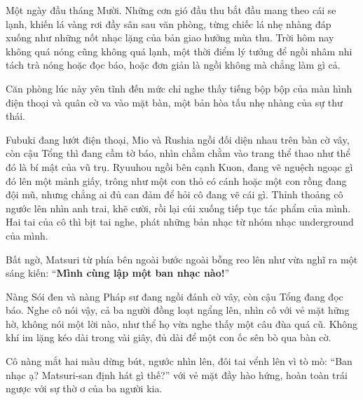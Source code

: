 \documentclass[../main.tex]{subfiles}
\begin{document}

Một ngày đầu tháng Mười. Những cơn gió đầu thu bắt đầu mang theo cái se lạnh, khiến lá vàng rơi đầy sân sau văn phòng, từng chiếc lá nhẹ nhàng đáp xuống như những nốt nhạc lặng của bản giao hưởng mùa thu. Trời hôm nay không quá nóng cũng không quá lạnh, một thời điểm lý tưởng để ngồi nhâm nhi tách trà nóng hoặc đọc báo, hoặc đơn giản là ngồi không mà chẳng làm gì cả.

Căn phòng lúc này yên tĩnh đến mức chỉ nghe thấy tiếng bộp bộp của màn hình điện thoại và quân cờ va vào mặt bàn, một bản hòa tấu nhẹ nhàng của sự thư thái.

Fubuki đang lướt điện thoại, Mio và Rushia ngồi đối diện nhau trên bàn cờ vây, còn cậu Tổng thì đang cầm tờ báo, nhìn chằm chằm vào trang thể thao như thể đó là bí mật của vũ trụ. Ryuuhou ngồi bên cạnh Kuon, đang vẽ nguệch ngoạc gì đó lên một mảnh giấy, trông như một con thỏ có cánh hoặc một con rồng đang đội mũ, nhưng chẳng ai đủ can đảm để hỏi cô đang vẽ cái gì. Thỉnh thoảng cô ngước lên nhìn anh trai, khẽ cười, rồi lại cúi xuống tiếp tục tác phẩm của mình. Hai tai của cô thì bịt tai nghe, phát những bản nhạc từ nhóm nhạc underground của mình.

Bất ngờ, Matsuri từ phía bên ngoài bước ngoài bỗng reo lên như vừa nghĩ ra một sáng kiến: ``\textbf{Mình cùng lập một ban nhạc nào!}''

Nàng Sói đen và nàng Pháp sư đang ngồi đánh cờ vây, còn cậu Tổng đang đọc báo. Nghe cô nói vậy, cả ba người đồng loạt ngẩng lên, nhìn cô với vẻ mặt hững hờ, không nói một lời nào, như thể họ vừa nghe thấy một câu đùa quá cũ. Không khí im lặng kéo dài trong vài giây, đủ dài để một con ốc sên bò qua bàn cờ.

Cô nàng mắt hai màu dừng bút, ngước nhìn lên, đôi tai vểnh lên vì tò mò: ``Ban nhạc ạ? Matsuri-san định hát gì thế?'' với vẻ mặt đầy hào hứng, hoàn toàn trái ngược với sự thờ ơ của ba người kia.
\end{document}
